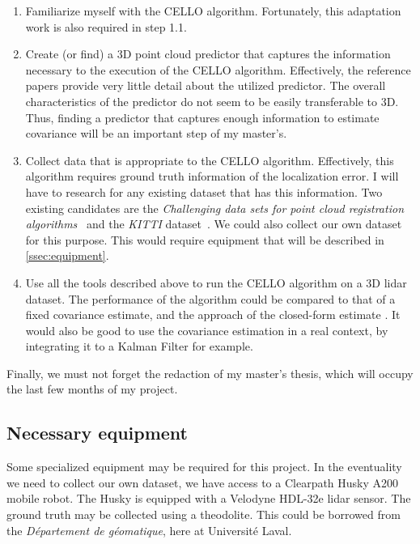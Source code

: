 \documentclass[10pt,letterpaper,oneside]{article}
\begin{document}
\begin{enumerate}[{2.}1]
\item Familiarize myself with the \ac{CELLO} algorithm.
  Fortunately, this adaptation work is also required in step 1.1.
\item Create (or find) a 3D point cloud predictor that captures the information necessary to the execution of the \ac{CELLO} algorithm.
  Effectively, the reference papers \cite{VegaBrown2013,VegaBrown2013em} provide very little detail about the utilized predictor.
  The overall characteristics of the predictor do not seem to be easily transferable to 3D.
  Thus, finding a predictor that captures enough information to estimate covariance will be an important step of my master's.
\item Collect data that is appropriate to the \ac{CELLO} algorithm.
  Effectively, this algorithm requires ground truth information of the localization error.
  I will have to research for any existing dataset that has this information.
  Two existing candidates are the \emph{Challenging data sets for point cloud registration algorithms}~\cite{Pomerleau2012} and the \emph{KITTI} dataset~\cite{Geiger2013}.
  We could also collect our own dataset for this purpose.
  This would require equipment that will be described in \autoref{ssec:equipment}.
\item Use all the tools described above to run the \ac{CELLO} algorithm on a 3D lidar dataset.
  The performance of the algorithm could be compared to that of a fixed covariance estimate, and the approach of the closed-form estimate \cite{Manoj2015}.
  It would also be good to use the covariance estimation in a real context, by integrating it to a Kalman Filter for example.
\end{enumerate}

Finally, we must not forget the redaction of my master's thesis, which will occupy the last few months of my project.



\subsection{Necessary equipment}
\label{ssec:equipment}

Some specialized equipment may be required for this project.
In the eventuality we need to collect our own dataset, we have access to a Clearpath Husky A200 mobile robot.
The Husky is equipped with a Velodyne HDL-32e lidar sensor.
The ground truth may be collected using a theodolite.
This could be borrowed from the \textit{Département de géomatique}, here at Université Laval.
\end{document}
